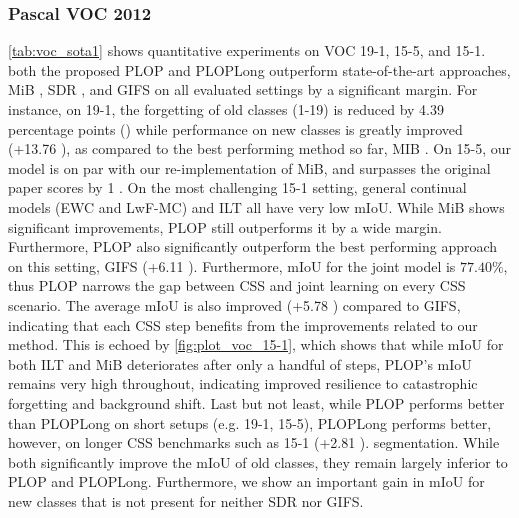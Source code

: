\subsubsection{Pascal VOC 2012}
\autoref{tab:voc_sota1} shows quantitative experiments on VOC 19-1, 15-5, and 15-1. both the
proposed PLOP and PLOPLong outperform state-of-the-art approaches, MiB
\citep{cermelli2020modelingthebackground}, SDR \citep{michieli2021sdr}, and GIFS
\citep{cermelli2020fewshotcontinualsegm} on all evaluated settings by a significant margin. For
instance, on 19-1, the forgetting of old classes (1-19) is reduced by 4.39 percentage points (\pp)
while performance on new classes is greatly improved (+13.76 \pp), as compared to the best
performing method so far, MIB \citep{cermelli2020modelingthebackground}. On 15-5, our model is on par
with our re-implementation of MiB, and surpasses the original paper scores
\citep{cermelli2020modelingthebackground} by 1 \pp. On the most challenging 15-1 setting, general
continual models (EWC and LwF-MC) and ILT all have very low mIoU. While MiB shows significant
improvements, PLOP still outperforms it by a wide margin. Furthermore, PLOP also significantly
outperform the best performing approach on this setting, GIFS
\citep{cermelli2020fewshotcontinualsegm} (+6.11 \pp). Furthermore, mIoU for the joint model is
$77.40\%$, thus PLOP narrows the gap between CSS and joint learning on every CSS scenario. The
average mIoU is also improved (+5.78 \pp) compared to GIFS, indicating that each CSS step benefits
from the improvements related to our method. This is echoed by \autoref{fig:plot_voc_15-1}, which
shows that while mIoU for both ILT and MiB deteriorates after only a handful of steps, PLOP's mIoU
remains very high throughout, indicating improved resilience to catastrophic forgetting and
background shift. Last but not least, while PLOP performs better than PLOPLong on short setups (e.g.
19-1, 15-5), PLOPLong performs better, however, on longer CSS benchmarks such as 15-1 (+2.81 \pp).
segmentation. While both significantly improve the mIoU of old classes, they remain largely inferior
to PLOP and PLOPLong. Furthermore, we show an important gain in mIoU for new classes that is not
present for neither SDR nor GIFS.





